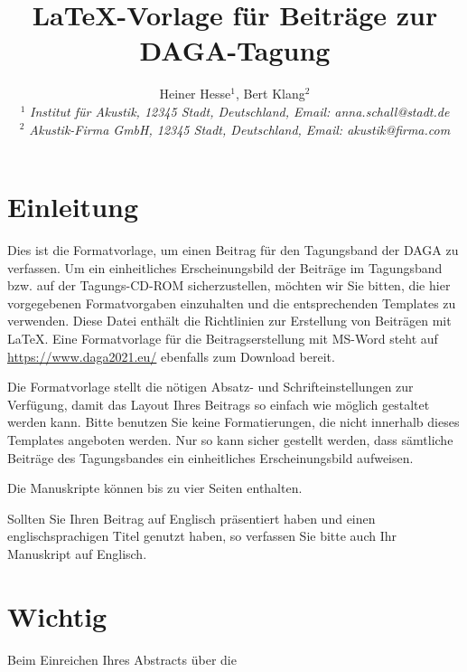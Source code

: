 \documentclass[a4paper, 10pt, twocolumn]{article}
\begin{document}
\date{}                                         %

\title{\vspace{-8mm}\textbf{\large
\LaTeX-Vorlage für Beiträge zur DAGA-Tagung }}


\author{
Heiner Hesse$^1$, Bert Klang$^2$\\
$^1$ \emph{\small Institut für Akustik, 12345 Stadt,
Deutschland, Email: anna.schall@stadt.de
}\\
$^2$ \emph{\small Akustik-Firma GmbH, 12345 Stadt, Deutschland,
Email: akustik@firma.com } } \maketitle


\thispagestyle{empty}           %
\section*{Einleitung}
\label{sec:Einleitung} Dies ist die Formatvorlage, um einen Beitrag
für den Tagungsband der DAGA zu verfassen. Um ein einheitliches
Erscheinungsbild der Beiträge im Tagungsband bzw. auf der Tagungs-CD-ROM
sicherzustellen, möchten wir Sie bitten, die hier vorgegebenen Formatvorgaben
einzuhalten und die entsprechenden Templates zu verwenden. Diese Datei enthält
die Richtlinien zur Erstellung von Beiträgen mit \LaTeX. Eine Formatvorlage
für die Beitragserstellung mit MS-Word steht auf
\url{https://www.daga2021.eu/} ebenfalls zum Download
bereit.

Die Formatvorlage stellt die nötigen Absatz- und Schrift\-einstellungen zur Verfügung, damit das Layout Ihres Beitrags so einfach wie möglich gestaltet werden kann. Bitte benutzen Sie keine Formatierungen, die nicht innerhalb dieses Templates angeboten werden. Nur so kann sicher gestellt werden, dass sämtliche Beiträge des Tagungsbandes ein einheitliches Erscheinungsbild aufweisen.

Die Manuskripte können bis zu vier Seiten enthalten.
 
Sollten Sie Ihren Beitrag auf Englisch präsentiert haben und einen englischsprachigen Titel genutzt haben, so verfassen Sie bitte auch Ihr Manuskript auf Englisch.


\section*{Wichtig}
\label{sec:Wichtig} Beim Einreichen Ihres Abstracts über die
\end{document}
